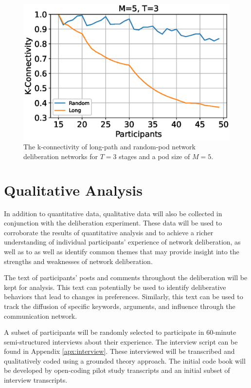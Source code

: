 \begin{figure}
\label{fig:kcon}
\includegraphics[width=5in]{fig/Experiment/fig-kcon.eps}
\caption{The k-connectivity of long-path and random-pod network deliberation
networks for $T=3$ stages and a pod size of $M=5$.}
\end{figure}

\section{Qualitative Analysis}
In addition to quantitative data,
qualitative data will also be collected in conjunction with
the deliberation experiment.
These data will be used to corroborate the results of quantitative
analysis and to achieve a richer understanding of individual participants'
experience of network deliberation,
as well as to as well as identify common themes that may provide
insight into the strengths and weaknesses of network deliberation.

The text of participants' posts and comments throughout the deliberation
will be kept for analysis.
This text can potentially be used to identify deliberative behaviors that
lead to changes in preferences.
Similarly, this text can be used to track the diffusion of specific keywords,
arguments, and influence through the communication network.

A subset of participants will be randomly selected to participate in
60-minute semi-structured interviews about their experience.
The interview script can be found in Appendix \ref{apx:interview}.
These interviewed will be transcribed and qualitatively coded using a
grounded theory approach.
The initial code book will be developed by open-coding pilot study transcripts
and an initial subset of interview transcripts.


